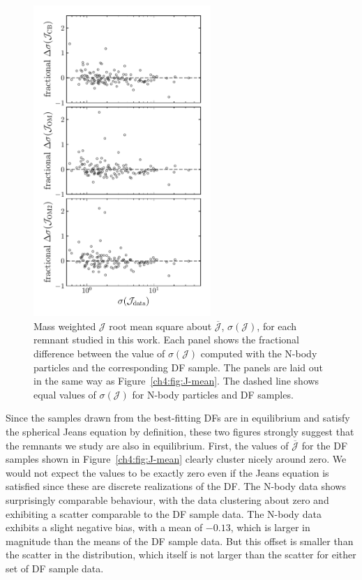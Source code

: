 \begin{figure}
    \centering
    \includegraphics[width=0.6\textwidth]{figure/ch4/J_dispersion.pdf}
    \caption{Mass weighted $\mathcal{J}$ root mean square about $\overline{\mathcal{J}}$, $\sigma(\mathcal{J})$, for each remnant studied in this work. Each panel shows the fractional difference between the value of $\sigma(\mathcal{J})$ computed with the N-body particles and the corresponding DF sample. The panels are laid out in the same way as Figure~\ref{ch4:fig:J-mean}. The dashed line shows equal values of $\sigma(\mathcal{J})$ for N-body particles and DF samples.}
    \label{ch4:fig:J-dispersion}
\end{figure}

Since the samples drawn from the best-fitting DFs are in equilibrium and satisfy the spherical Jeans equation by definition, these two figures strongly suggest that the remnants we study are also in equilibrium. First, the values of $\overline{\mathcal{J}}$ for the DF samples shown in Figure~\ref{ch4:fig:J-mean} clearly cluster nicely around zero. We would not expect the values to be exactly zero even if the Jeans equation is satisfied since these are discrete realizations of the DF. The N-body data shows surprisingly comparable behaviour, with the data clustering about zero and exhibiting a scatter comparable to the DF sample data. The N-body data exhibits a slight negative bias, with a mean of $-0.13$, which is larger in magnitude than the means of the DF sample data. But this offset is smaller than the scatter in the distribution, which itself is not larger than the scatter for either set of DF sample data.

